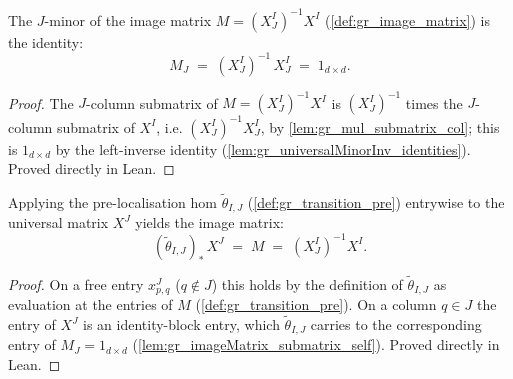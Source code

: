 \begin{lemma}\leanok
  \label{lem:gr_imageMatrix_submatrix_self}
  The \(J\)-minor of the image matrix \(M = (X^I_J)^{-1} X^I\)
  (\cref{def:gr_image_matrix}) is the identity:
  \[
    M_J \;=\; (X^I_J)^{-1}\, X^I_J \;=\; 1_{d\times d}.
  \]
\end{lemma}
\begin{proof}

\leanok
  The \(J\)-column submatrix of \(M = (X^I_J)^{-1} X^I\) is
  \((X^I_J)^{-1}\) times the \(J\)-column submatrix of \(X^I\), i.e.
  \((X^I_J)^{-1} X^I_J\), by \cref{lem:gr_mul_submatrix_col}; this is
  \(1_{d\times d}\) by the left-inverse identity
  (\cref{lem:gr_universalMinorInv_identities}). Proved directly in Lean.
\end{proof}


\begin{lemma}\leanok
  \label{lem:gr_universalMatrix_map_transitionPreMap}
  Applying the pre-localisation hom \(\tilde\theta_{I,J}\)
  (\cref{def:gr_transition_pre}) entrywise to the universal matrix \(X^J\) yields
  the image matrix:
  \[
    (\tilde\theta_{I,J})_\ast\, X^J \;=\; M \;=\; (X^I_J)^{-1} X^I .
  \]
\end{lemma}
\begin{proof}

\leanok
  On a free entry \(x^J_{p,q}\) (\(q \notin J\)) this holds by the definition of
  \(\tilde\theta_{I,J}\) as evaluation at the entries of \(M\)
  (\cref{def:gr_transition_pre}). On a column \(q \in J\) the entry of \(X^J\) is
  an identity-block entry, which \(\tilde\theta_{I,J}\) carries to the
  corresponding entry of \(M_J = 1_{d\times d}\)
  (\cref{lem:gr_imageMatrix_submatrix_self}). Proved directly in Lean.
\end{proof}

